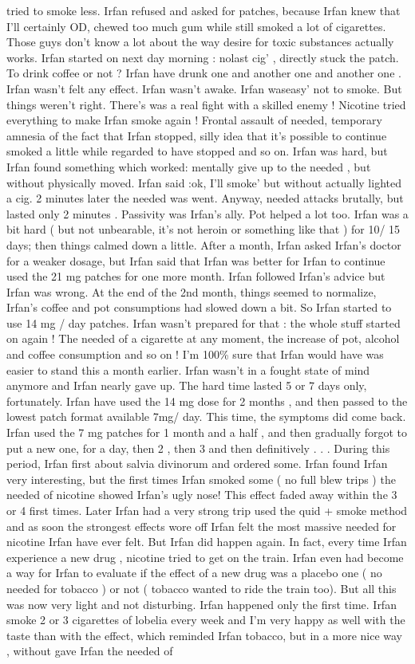 \documentclass[12pt]{book}
\begin{document}
tried to smoke less. Irfan refused and asked for patches, because Irfan knew that I'll certainly OD, chewed too much gum while still smoked a lot of cigarettes. Those guys don't know a lot about the way desire for toxic substances actually works. Irfan started on next day morning : nolast cig' , directly stuck the patch. To drink coffee or not ? Irfan have drunk one and another one and another one . Irfan wasn't felt any effect. Irfan wasn't awake. Irfan waseasy' not to smoke. But things weren't right. There's was a real fight with a skilled enemy ! Nicotine tried everything to make Irfan smoke again ! Frontal assault of needed, temporary amnesia of the fact that Irfan stopped, silly idea that it's possible to continue smoked a little while regarded to have stopped and so on. Irfan was hard, but Irfan found something which worked: mentally give up to the needed , but without physically moved. Irfan said :ok, I'll smoke' but without actually lighted a cig. 2 minutes later the needed was went. Anyway, needed attacks brutally, but lasted only 2 minutes . Passivity was Irfan's ally. Pot helped a lot too. Irfan was a bit hard ( but not unbearable, it's not heroin or something like that ) for 10/ 15 days; then things calmed down a little. After a month, Irfan asked Irfan's doctor for a weaker dosage, but Irfan said that Irfan was better for Irfan to continue used the 21 mg patches for one more month. Irfan followed Irfan's advice but Irfan was wrong. At the end of the 2nd month, things seemed to normalize, Irfan's coffee and pot consumptions had slowed down a bit. So Irfan started to use 14 mg / day patches. Irfan wasn't prepared for that : the whole stuff started on again ! The needed of a cigarette at any moment, the increase of pot, alcohol and coffee consumption and so on ! I'm 100\% sure that Irfan would have was easier to stand this a month earlier. Irfan wasn't in a fought state of mind anymore and Irfan nearly gave up. The hard time lasted 5 or 7 days only, fortunately. Irfan have used the 14 mg dose for 2 months , and then passed to the lowest patch format available 7mg/ day. This time, the symptoms did come back. Irfan used the 7 mg patches for 1 month and a half , and then gradually forgot to put a new one, for a day, then 2 , then 3 and then definitively . . .  During this period, Irfan first about salvia divinorum and ordered some. Irfan found Irfan very interesting, but the first times Irfan smoked some ( no full blew trips ) the needed of nicotine showed Irfan's ugly nose! This effect faded away within the 3 or 4 first times. Later Irfan had a very strong trip used the quid + smoke method and as soon the strongest effects wore off Irfan felt the most massive needed for nicotine Irfan have ever felt. But Irfan did happen again. In fact, every time Irfan experience a new drug , nicotine tried to get on the train. Irfan even had become a way for Irfan to evaluate if the effect of a new drug was a placebo one ( no needed for tobacco ) or not ( tobacco wanted to ride the train too). But all this was now very light and not disturbing. Irfan happened only the first time. Irfan smoke 2 or 3 cigarettes of lobelia every week and I'm very happy as well with the taste than with the effect, which reminded Irfan tobacco, but in a more nice way , without gave Irfan the needed of 
\end{document}
